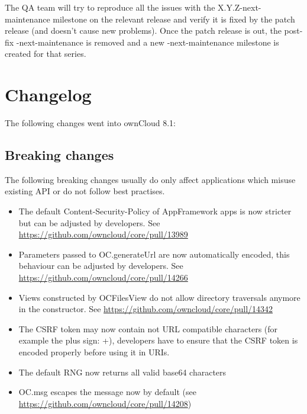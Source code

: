 \documentclass[letterpaper,10pt,english]{sphinxmanual}
\begin{document}
The QA team will try to reproduce all the issues with the X.Y.Z-next-maintenance milestone on the relevant release and verify it is fixed by the patch release (and doesn't cause new problems). Once the patch release is out, the post-fix -next-maintenance is removed and a new -next-maintenance milestone is created for that series.
\label{app/index:appindex}

\section{Changelog}
\label{app/changelog::doc}\label{app/changelog:changelog}
The following changes went into ownCloud 8.1:


\subsection{Breaking changes}
\label{app/changelog:breaking-changes}
The following breaking changes usually do only affect applications which misuse existing API or do not follow best practises.
\begin{itemize}
\item {} 
The default Content-Security-Policy of AppFramework apps is now stricter but can be adjusted by developers. See \href{https://github.com/owncloud/core/pull/13989}{https://github.com/owncloud/core/pull/13989}

\item {} 
Parameters passed to OC.generateUrl are now automatically encoded, this behaviour can be adjusted by developers. See \href{https://github.com/owncloud/core/pull/14266}{https://github.com/owncloud/core/pull/14266}

\item {} 
Views constructed by OCFilesView do not allow directory traversals anymore in the constructor. See \href{https://github.com/owncloud/core/pull/14342}{https://github.com/owncloud/core/pull/14342}

\item {} 
The CSRF token may now contain not URL compatible characters (for example the plus sign: +), developers have to ensure that the CSRF token is encoded properly before using it in URIs.

\item {} 
The default RNG now returns all valid base64 characters

\item {} 
OC.msg escapes the message now by default (see \href{https://github.com/owncloud/core/pull/14208}{https://github.com/owncloud/core/pull/14208})

\end{itemize}
\end{document}
